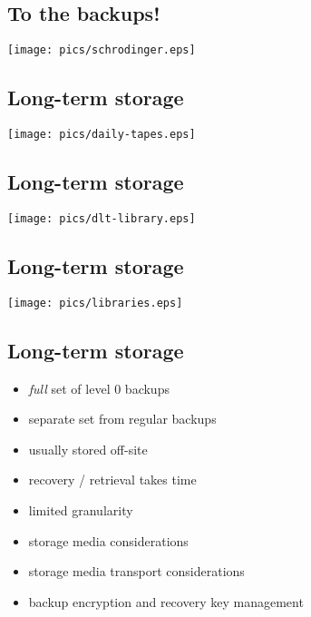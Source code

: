 \documentclass[xga]{xdvislides}
\begin{document}
\subsection{To the backups!}
\vspace*{\fill}
\begin{center}
	\texttt{[image: pics/schrodinger.eps]}
\end{center}
\vspace*{\fill}

\subsection{Long-term storage}
\vspace*{\fill}
\begin{center}
	\texttt{[image: pics/daily-tapes.eps]}
\end{center}
\vspace*{\fill}

\subsection{Long-term storage}
\vspace*{\fill}
\begin{center}
	\texttt{[image: pics/dlt-library.eps]}
\end{center}
\vspace*{\fill}

\subsection{Long-term storage}
\vspace*{\fill}
\begin{center}
	\texttt{[image: pics/libraries.eps]}
\end{center}
\vspace*{\fill}

\subsection{Long-term storage}
\begin{itemize}
	\item {\em full} set of level 0 backups
	\item separate set from regular backups
	\item usually stored off-site
	\item recovery / retrieval takes time
	\item limited granularity
	\item storage media considerations
	\item storage media transport considerations
	\item backup encryption and recovery key management
\end{itemize}
\end{document}
